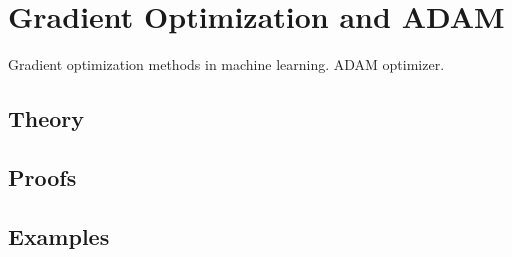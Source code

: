 
\section{Gradient Optimization and ADAM}
\label{sec:1.4.09-gradient-adam}

\begin{ticket}
Gradient optimization methods in machine learning. ADAM optimizer.
\end{ticket}

\subsection*{Theory}

\subsection*{Proofs}

\subsection*{Examples}
